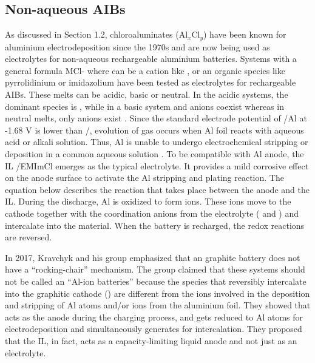 \subsection{Non-aqueous AIBs}
As discussed in Section 1.2, chloroaluminates (Al$_x$Cl$_y$) have been known for aluminium electrodeposition since the 1970s and are now being used as electrolytes for non-aqueous rechargeable aluminium batteries\cite{weppner_ionic_1976, fung_reaction_1972}. Systems with a general formula MCl- where  can be a cation like ,  or an organic species like pyrrolidinium or imidazolium have been tested as electrolytes for rechargeable AIBs\cite{das_aluminium-ion_2017}. These melts can be acidic, basic or neutral. In the acidic systems, the dominant species is , while in a basic system  and  anions coexist whereas in neutral melts, only  anions exist \cite{galinski_ionic_2006,holbrey_ionic_1999}. Since the standard electrode potential of /Al at -1.68 V is lower than /, evolution of  gas occurs when Al foil reacts with aqueous acid or alkali solution. Thus, Al is unable to undergo electrochemical stripping or deposition in a common aqueous solution \cite{wu_electrochemically_2019}. To be compatible with Al anode, the IL /EMImCl emerges as the typical electrolyte. It provides a mild corrosive effect on the anode surface to activate the Al stripping and plating reaction. The equation below describes the reaction that takes place between the anode and the IL. During the discharge, Al is oxidized to form  ions. These ions move to the cathode together with the coordination anions from the electrolyte ( and ) and intercalate into the material. When the battery is recharged, the redox reactions are reversed.

In 2017, Kravchyk and his group emphasized that an  graphite battery does not have a \enquote{rocking-chair} mechanism. The group claimed that these systems should not be called an \enquote{Al-ion batteries} because the species that reversibly intercalate into the graphitic cathode () are different from the ions involved in the deposition and stripping of Al atoms and/or  ions from the aluminium foil. They showed that  acts as the anode during the charging process, and gets reduced to Al atoms for electrodeposition and simultaneously generates  for intercalation. They proposed that the IL, in fact, acts as a capacity-limiting liquid anode and not just as an electrolyte.

